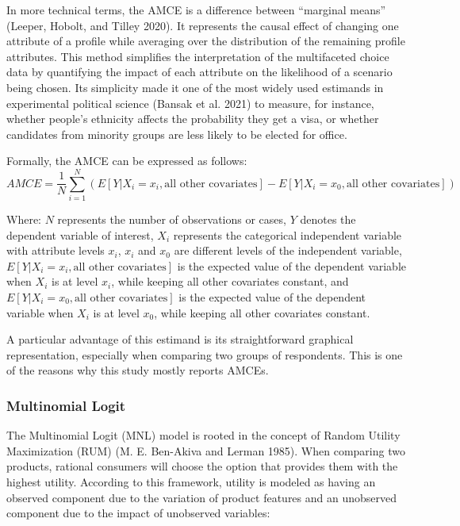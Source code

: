 \documentclass[
  12pt,
]{article}
\begin{document}
In more technical terms, the AMCE is a difference between ``marginal means'' (Leeper, Hobolt, and Tilley 2020). It represents the causal effect of changing one attribute of a profile while averaging over the distribution of the remaining profile attributes. This method simplifies the interpretation of the multifaceted choice data by quantifying the impact of each attribute on the likelihood of a scenario being chosen. Its simplicity made it one of the most widely used estimands in experimental political science (Bansak et al. 2021) to measure, for instance, whether people's ethnicity affects the probability they get a visa, or whether candidates from minority groups are less likely to be elected for office.

Formally, the AMCE can be expressed as follows:\[AMCE = \frac{1}{N} \sum_{i=1}^{N} (E[Y|X_i=x_i, \text{all other covariates}] - E[Y|X_i=x_0, \text{all other covariates}])\]

Where: \(N\) represents the number of observations or cases, \(Y\) denotes the dependent variable of interest, \(X_i\) represents the categorical independent variable with attribute levels \(x_i\), \(x_i\) and \(x_0\) are different levels of the independent variable, \(E[Y|X_i=x_i, \text{all other covariates}]\) is the expected value of the dependent variable when \(X_i\) is at level \(x_i\), while keeping all other covariates constant, and \(E[Y|X_i=x_0, \text{all other covariates}]\) is the expected value of the dependent variable when \(X_i\) is at level \(x_0\), while keeping all other covariates constant.

A particular advantage of this estimand is its straightforward graphical representation, especially when comparing two groups of respondents. This is one of the reasons why this study mostly reports AMCEs.

\hypertarget{multinomial-logit}{%
\subsubsection{Multinomial Logit}\label{multinomial-logit}}

The Multinomial Logit (MNL) model is rooted in the concept of Random Utility Maximization (RUM) (M. E. Ben-Akiva and Lerman 1985). When comparing two products, rational consumers will choose the option that provides them with the highest utility. According to this framework, utility is modeled as having an observed component due to the variation of product features and an unobserved component due to the impact of unobserved variables:
\end{document}
